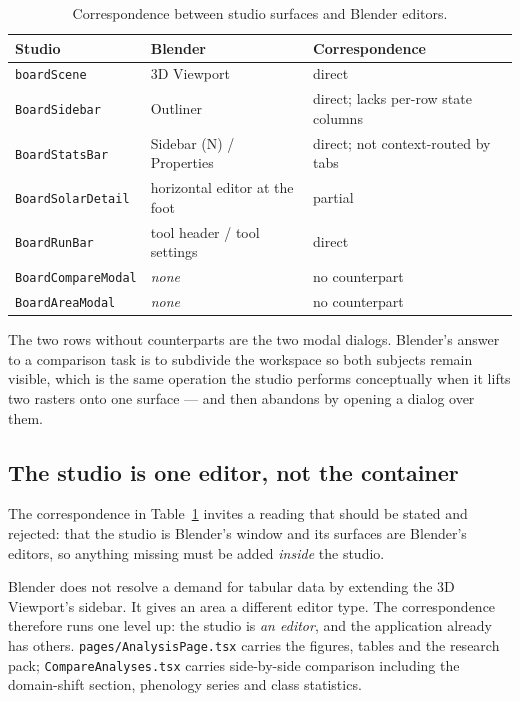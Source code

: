\documentclass[11pt,a4paper]{article}
\newcommand{\code}[1]{\texttt{\small #1}}
\begin{document}
\begin{table}[h]
\centering
\small
\caption{Correspondence between studio surfaces and Blender editors.}
\label{tab:map}
\begin{tabular}{@{}lll@{}}
\toprule
Studio & Blender & Correspondence \\
\midrule
\code{boardScene}        & 3D Viewport            & direct \\
\code{BoardSidebar}      & Outliner               & direct; lacks per-row state columns \\
\code{BoardStatsBar}     & Sidebar (N) / Properties & direct; not context-routed by tabs \\
\code{BoardSolarDetail}  & horizontal editor at the foot & partial \\
\code{BoardRunBar}       & tool header / tool settings & direct \\
\code{BoardCompareModal} & \emph{none}            & no counterpart \\
\code{BoardAreaModal}    & \emph{none}            & no counterpart \\
\bottomrule
\end{tabular}
\end{table}

The two rows without counterparts are the two modal dialogs. Blender's answer to
a comparison task is to subdivide the workspace so both subjects remain visible,
which is the same operation the studio performs conceptually when it lifts two
rasters onto one surface --- and then abandons by opening a dialog over them.

\subsection{The studio is one editor, not the container}
\label{sec:oneeditor}

The correspondence in Table~\ref{tab:map} invites a reading that should be
stated and rejected: that the studio is Blender's window and its surfaces are
Blender's editors, so anything missing must be added \emph{inside} the studio.

Blender does not resolve a demand for tabular data by extending the 3D
Viewport's sidebar. It gives an area a different editor type. The
correspondence therefore runs one level up: the studio is \emph{an editor}, and
the application already has others. \code{pages/AnalysisPage.tsx} carries the
figures, tables and the research pack; \code{CompareAnalyses.tsx} carries
side-by-side comparison including the domain-shift section, phenology series
and class statistics.
\end{document}
